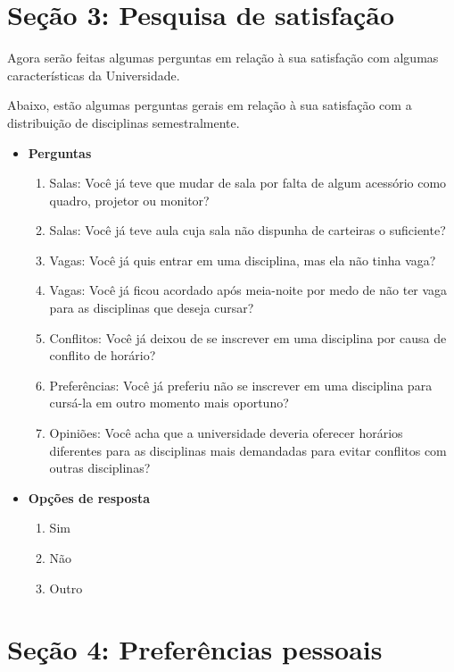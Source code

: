 \begin{apendicesenv}
    \section*{Seção 3: Pesquisa de satisfação}

        Agora serão feitas algumas perguntas em relação à sua satisfação com algumas características da Universidade.

        Abaixo, estão algumas perguntas gerais em relação à sua satisfação com a distribuição de disciplinas semestralmente.

        \begin{itemize}
            \item \textbf{Perguntas}
            \begin{enumerate}
                \item Salas: Você já teve que mudar de sala por falta de algum acessório como quadro, projetor ou monitor?
                \item Salas: Você já teve aula cuja sala não dispunha de carteiras o suficiente?
                \item Vagas: Você já quis entrar em uma disciplina, mas ela não tinha vaga?
                \item Vagas: Você já ficou acordado após meia-noite por medo de não ter vaga para as disciplinas que deseja cursar?
                \item Conflitos: Você já deixou de se inscrever em uma disciplina por causa de conflito de horário?
                \item Preferências: Você já preferiu não se inscrever em uma disciplina para cursá-la em outro momento mais oportuno?
                \item Opiniões: Você acha que a universidade deveria oferecer horários diferentes para as disciplinas mais demandadas para evitar conflitos com outras disciplinas?
            \end{enumerate}
            \item \textbf{Opções de resposta}
            \begin{enumerate}
                \item Sim
                \item Não
                \item Outro
            \end{enumerate}
        \end{itemize}

    \section*{Seção 4: Preferências pessoais}


\end{apendicesenv}
